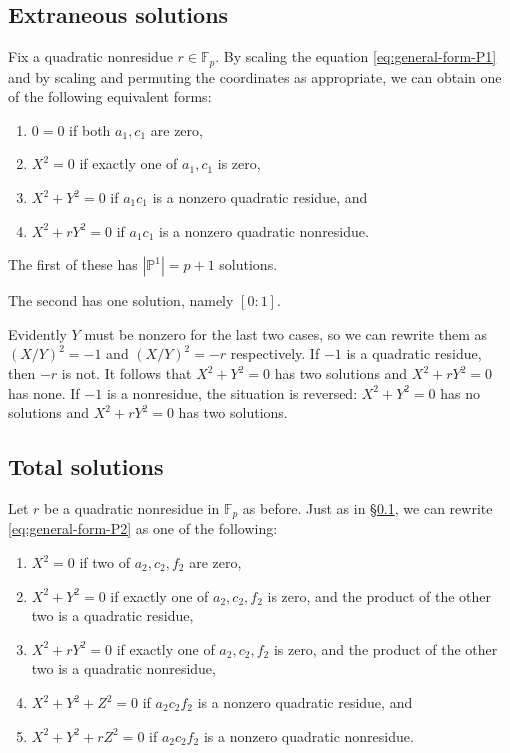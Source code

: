 \documentclass[10pt,a4paper]{amsart}
\numberwithin{equation}{section}
\numberwithin{figure}{section}
\theoremstyle{definition}
\theoremstyle{remark}
\theoremstyle{plain}
\theoremstyle{plain}
\theoremstyle{definition}
\theoremstyle{plain}
\theoremstyle{plain}
\renewcommand{\P}{\mathbb{P}}
\newcommand{\F}{\mathbb{F}}
\begin{document}
\subsection{Extraneous solutions}\label{subsec:counting-P1-solutions}
Fix a quadratic nonresidue $r \in \F_p$. By scaling the equation \eqref{eq:general-form-P1} and by scaling and permuting the coordinates as appropriate, we can obtain one of the following equivalent forms:
\begin{enumerate}
	\item $0 = 0$ if both $a_1, c_1$ are zero,
	\item $X^2 = 0$ if exactly one of $a_1, c_1$ is zero,
	\item $X^2 + Y^2 = 0$ if $a_1 c_1$ is a nonzero quadratic residue, and \label{case:x^2+y^2=0}
	\item $X^2 + rY^2 = 0$ if $a_1 c_1$ is a nonzero quadratic nonresidue.
\end{enumerate}

The first of these has $|\P^1| = p+1$ solutions. 

The second has one solution, namely $[0:1]$.

Evidently $Y$ must be nonzero for the last two cases, so we can rewrite them as $(X/Y)^2 = -1$ and $(X/Y)^2 = -r$ respectively. If $-1$ is a quadratic residue, then $-r$ is not. It follows that $X^2 + Y^2 = 0$ has two solutions and $X^2 + rY^2 = 0$ has none. If $-1$ is a nonresidue, the situation is reversed: $X^2 + Y^2 = 0$ has no solutions and $X^2 + rY^2 = 0$ has two solutions.

\subsection{Total solutions}\label{subsec:counting-P2-solutions}
Let $r$ be a quadratic nonresidue in $\F_p$ as before. Just as in \S\ref{subsec:counting-P1-solutions}, we can rewrite \eqref{eq:general-form-P2} as one of the following:
\begin{enumerate}
	\item $X^2 = 0$ if two of $a_2, c_2, f_2$ are zero,
	\item $X^2 + Y^2 = 0$ if exactly one of $a_2, c_2, f_2$ is zero, and the product of the other two is a quadratic residue,
	\item $X^2 + rY^2 = 0$ if exactly one of $a_2, c_2, f_2$ is zero, and the product of the other two is a quadratic nonresidue,
	\item $X^2 + Y^2 + Z^2 = 0$ if $a_2 c_2 f_2$ is a nonzero quadratic residue, and
	\item $X^2 + Y^2 + rZ^2 = 0$ if $a_2 c_2 f_2$ is a nonzero quadratic nonresidue.
\end{enumerate}
\end{document}
